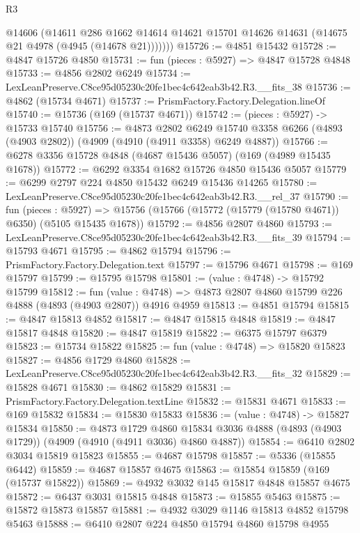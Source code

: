\begin{lexlean}{R3}
\begin{coremodule}
          @14606
          (@14611
            @286
            @1662
            @14614
            @14621
            @15701
            @14626
            @14631
            (@14675 @21 @4978 (@4945 (@14678 @21)))))))
@15726 := @4851 @15432
@15728 := @4847 @15726 @4850
@15731 := fun (pieces : @5927) => @4847 @15728 @4848
@15733 := @4856 @2802 @6249
@15734 := LexLeanPreserve.C8ce95d05230c20fe1bec4c642eab3b42.R3.__fits_38
@15736 := @4862 (@15734 @4671)
@15737 := PrismFactory.Factory.Delegation.lineOf
@15740 := @15736 (@169 (@15737 @4671))
@15742 := (pieces : @5927) -> @15733 @15740
@15756 := @4873
    @2802
    @6249
    @15740
    @3358
    @6266
    (@4893 (@4903 @2802))
    (@4909 (@4910 (@4911 @3358) @6249 @4887))
@15766 := @6278 @3356 @15728 @4848 (@4687 @15436 @5057) (@169 (@4989 @15435 @1678))
@15772 := @6292 @3354 @1682 @15726 @4850 @15436 @5057
@15779 := @6299 @2797 @224 @4850 @15432 @6249 @15436 @14265
@15780 := LexLeanPreserve.C8ce95d05230c20fe1bec4c642eab3b42.R3.__rel_37
@15790 := fun (pieces : @5927) =>
  @15756 (@15766 (@15772 (@15779 (@15780 @4671)) @6350) (@5105 @15435 @1678))
@15792 := @4856 @2807 @4860
@15793 := LexLeanPreserve.C8ce95d05230c20fe1bec4c642eab3b42.R3.__fits_39
@15794 := @15793 @4671
@15795 := @4862 @15794
@15796 := PrismFactory.Factory.Delegation.text
@15797 := @15796 @4671
@15798 := @169 @15797
@15799 := @15795 @15798
@15801 := (value : @4748) -> @15792 @15799
@15812 := fun (value : @4748) =>
  @4873 @2807 @4860 @15799 @226 @4888 (@4893 (@4903 @2807)) @4916 @4959
@15813 := @4851 @15794
@15815 := @4847 @15813 @4852
@15817 := @4847 @15815 @4848
@15819 := @4847 @15817 @4848
@15820 := @4847 @15819
@15822 := @6375 @15797 @6379
@15823 := @15734 @15822
@15825 := fun (value : @4748) => @15820 @15823
@15827 := @4856 @1729 @4860
@15828 := LexLeanPreserve.C8ce95d05230c20fe1bec4c642eab3b42.R3.__fits_32
@15829 := @15828 @4671
@15830 := @4862 @15829
@15831 := PrismFactory.Factory.Delegation.textLine
@15832 := @15831 @4671
@15833 := @169 @15832
@15834 := @15830 @15833
@15836 := (value : @4748) -> @15827 @15834
@15850 := @4873
    @1729
    @4860
    @15834
    @3036
    @4888
    (@4893 (@4903 @1729))
    (@4909 (@4910 (@4911 @3036) @4860 @4887))
@15854 := @6410 @2802 @3034 @15819 @15823
@15855 := @4687 @15798
@15857 := @5336 (@15855 @6442)
@15859 := @4687 @15857 @4675
@15863 := @15854 @15859 (@169 (@15737 @15822))
@15869 := @4932 @3032 @145 @15817 @4848 @15857 @4675
@15872 := @6437 @3031 @15815 @4848
@15873 := @15855 @5463
@15875 := @15872 @15873 @15857
@15881 := @4932 @3029 @1146 @15813 @4852 @15798 @5463
@15888 := @6410 @2807 @224 @4850 @15794 @4860 @15798 @4955

\end{coremodule}
\end{lexlean}

